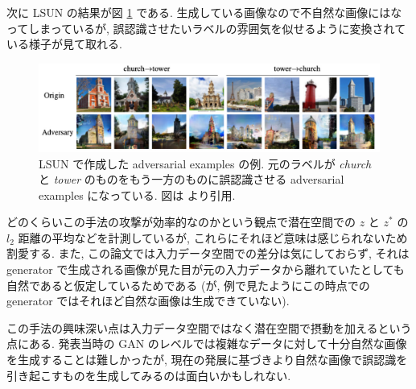 次に LSUN の結果が図 \ref{fig:generating-natural-example} である.
生成している画像なので不自然な画像にはなってしまっているが, 誤認識させたいラベルの雰囲気を似せるように変換されている様子が見て取れる.
%
\begin{figure}[htbp]
\begin{center}
\includegraphics[width=14.0cm]{figures/generating-natural-example.pdf}
\end{center}
\caption{
LSUN で作成した adversarial examples の例.
元のラベルが {\it church} と {\it tower} のものをもう一方のものに誤認識させる adversarial examples になっている.
図は \cite{zhao2017generating} より引用.
}
\label{fig:generating-natural-example}
\end{figure}
%

どのくらいこの手法の攻撃が効率的なのかという観点で潜在空間での $z$ と $z^*$ の $l_2$ 距離の平均などを計測しているが, これらにそれほど意味は感じられないため割愛する.
また, この論文では入力データ空間での差分は気にしておらず, それは generator で生成される画像が見た目が元の入力データから離れていたとしても自然であると仮定しているためである (が, 例で見たようにこの時点での generator ではそれほど自然な画像は生成できていない).

この手法の興味深い点は入力データ空間ではなく潜在空間で摂動を加えるという点にある.
発表当時の GAN のレベルでは複雑なデータに対して十分自然な画像を生成することは難しかったが, 現在の発展に基づきより自然な画像で誤認識を引き起こすものを生成してみるのは面白いかもしれない.



